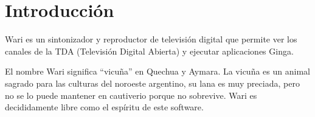 \section{Introducción}
Wari es un sintonizador y reproductor de televisión digital que permite ver los canales de la TDA (Televisión Digital Abierta) y ejecutar aplicaciones Ginga.

\vspace{0.5cm}
El nombre Wari significa ``vicuña'' en Quechua y Aymara. La vicuña es un animal sagrado para las culturas del noroeste argentino, su lana es muy preciada, pero no se lo puede mantener en cautiverio porque no sobrevive. Wari es decididamente libre como el espíritu de este software.
